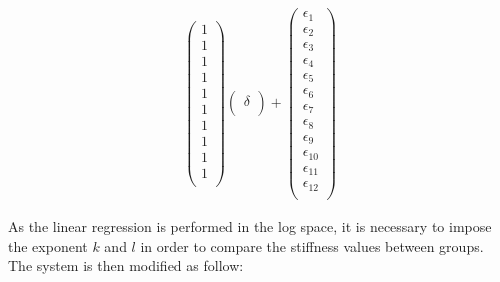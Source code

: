 \documentclass[a4paper,fleqn]{DC_ArtStyle}
\begin{document}
\begin{equation}
\begin{split}
\begin{pmatrix}
		1 \\
		1 \\
		1 \\
		1 \\
		1 \\
		1 \\
		1 \\
		1 \\
		1 \\
		1 \\
	\end{pmatrix}\begin{pmatrix}
	\delta \\
	\end{pmatrix} + \begin{pmatrix}
		\epsilon_{1} \\
		\epsilon_{2} \\
		\epsilon_{3} \\
		\epsilon_{4} \\
		\epsilon_{5} \\
		\epsilon_{6} \\
		\epsilon_{7} \\
		\epsilon_{8} \\
		\epsilon_{9} \\
		\epsilon_{10} \\
		\epsilon_{11} \\
		\epsilon_{12} \\
	\end{pmatrix}
	\end{split}
\end{equation}

As the linear regression is performed in the log space, it is necessary to impose the exponent $k$ and $l$ in order to compare the stiffness values between groups. The system is then modified as follow:
\end{document}
